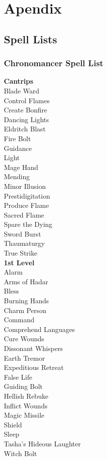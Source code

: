 \chapter{Apendix}

\section{Spell Lists}

\subsection{Chronomancer Spell List}


\textbf{Cantrips} \\
 Blade Ward \\
 Control Flames \\
 Create Bonfire \\
 Dancing Lights \\
 Eldritch Blast \\
 Fire Bolt \\
 Guidance \\
 Light \\
 Mage Hand \\
 Mending \\
 Minor Illusion \\
 Prestidigitation \\
 Produce Flame \\
 Sacred Flame \\
 Spare the Dying \\
 Sword Burst \\
 Thaumaturgy \\
 True Strike \\

\textbf{1st Level} \\
 Alarm \\
 Arms of Hadar \\
 Bless \\
 Burning Hands \\
 Charm Person \\
 Command \\
 Comprehend Languages \\
 Cure Wounds \\
 Dissonant Whispers \\
 Earth Tremor \\
 Expeditious Retreat \\
 False Life \\
 Guiding Bolt \\
 Hellish Rebuke \\
 Inflict Wounds \\
 Magic Missile \\
 Shield \\
 Sleep \\
 Tasha's Hideous Laughter \\
 Witch Bolt \\

